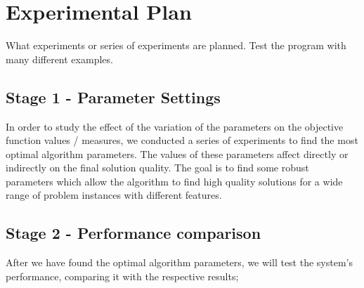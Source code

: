 \section{Experimental Plan}

What experiments or series of experiments are planned. Test the program with many different examples. 

\subsection{Stage 1 - Parameter Settings}

In order to study the effect of the variation of the parameters on the objective function values / measures, we conducted a series of experiments to find the most optimal algorithm parameters. The values of these parameters affect directly or indirectly on the final solution quality. The goal is to find some robust parameters which allow the algorithm to find high quality solutions for a wide range of problem instances with different features. 

\subsection{Stage 2 - Performance comparison}

After we have found the optimal algorithm parameters, we will test the system's performance, comparing it with the respective results;

